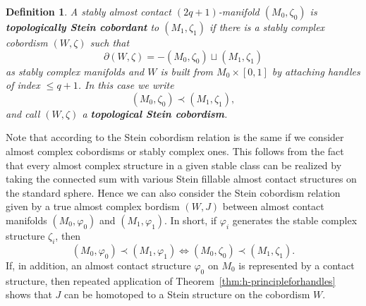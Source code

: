 \documentclass[12pt]{amsart}
\newcommand{\defin}[1]{\textbf{#1}}
\newcommand\acs{\varphi}  				%
\newtheorem{Definition}[Theorem]{Definition}
\theoremstyle{remark}
\begin{document}
\begin{Definition} \label{def:topological-Stein{-}cobordism}
A stably almost contact $(2q{+}1)$-manifold  $(M_0,\zeta_0)$ is \defin{topologically 
Stein cobordant} to $(M_1,\zeta_1)$ if there is a stably complex  cobordism $(W,\zeta)$ 
such that 
$$\partial (W, \zeta) = -(M_0,\zeta_0) \sqcup (M_1,\zeta_1)$$
as stably complex manifolds and $W$ is built from $M_0\times [0,1]$ 
by attaching handles of index $\le q{+}1$. In this case we write
$$(M_0,\zeta_0) \prec (M_1,\zeta_1),$$
and call $(W, \zeta )$ a \defin{topological Stein cobordism}.
\end{Definition}
Note that according to \cite[Lemma 3.6]{BCS2} the Stein cobordism
relation is the same if we consider almost complex cobordisms or
stably complex ones. This follows from the fact that every almost
complex structure in a given stable class can be realized by taking
the connected sum with various Stein fillable almost contact structures on
the standard sphere. Hence we can also consider the Stein cobordism
relation given by a true almost complex bordism $(W,J)$ between almost
contact manifolds $(M_0,\varphi_0) $ and $ (M_1,\varphi_1)$. In short,
if $\varphi _i$ generates the stable complex structure $\zeta _i$, then
%
\begin{equation} \label{eq:stable_and_unstable_Stein_cobordism}
(M_0,\varphi_0) \prec (M_1,\varphi_1) \Longleftrightarrow
(M_0,\zeta_0) \prec (M_1,\zeta_1).
\end{equation}
%
If, in addition, an almost contact structure $\varphi _0$ on
$M_0$ is represented by a contact structure, then repeated
application of Theorem~\ref{thm:h-principleforhandles} shows that $J$ can be homotoped to a Stein
structure on the cobordism $W$.
\end{document}

